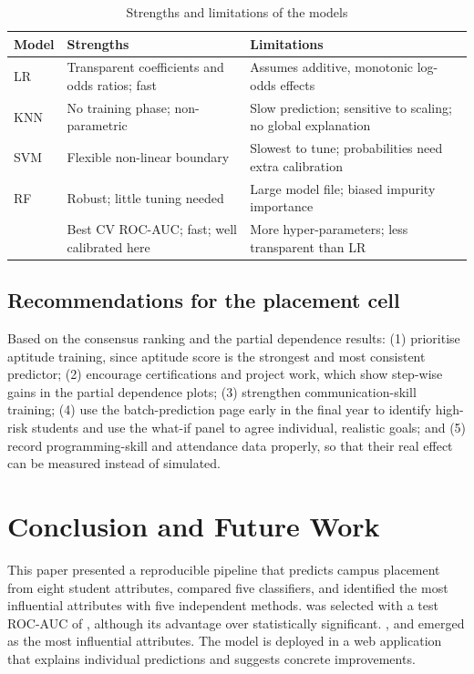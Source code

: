 \documentclass[conference]{IEEEtran}
\begin{document}
\begin{table}[t]
\centering
\caption{Strengths and limitations of the models}
\label{tab:sl}
\footnotesize
\begin{tabular}{p{1.3cm}p{3.0cm}p{3.2cm}}
\toprule
Model & Strengths & Limitations \\
\midrule
LR & Transparent coefficients and odds ratios; fast & Assumes additive, monotonic log-odds effects \\
KNN & No training phase; non-parametric & Slow prediction; sensitive to scaling; no global explanation \\
SVM & Flexible non-linear boundary & Slowest to tune; probabilities need extra calibration \\
RF & Robust; little tuning needed & Large model file; biased impurity importance \\
\XGBName{} & Best CV ROC-AUC; fast; well calibrated here & More hyper-parameters; less transparent than LR \\
\bottomrule
\end{tabular}
\end{table}

\subsection{Recommendations for the placement cell}
Based on the consensus ranking and the partial dependence results: (1) prioritise aptitude training, since aptitude
score is the strongest and most consistent predictor; (2) encourage certifications and project work, which show
step-wise gains in the partial dependence plots; (3) strengthen communication-skill training; (4) use the batch-prediction page early in
the final year to identify high-risk students and use the what-if panel to agree individual, realistic goals;
and (5) record programming-skill and attendance data properly, so that their real effect can be measured instead
of simulated.

\section{Conclusion and Future Work}\label{sec:conclusion}
This paper presented a reproducible pipeline that predicts campus placement from eight student attributes,
compared five classifiers, and identified the most influential attributes with five independent methods.
\BestModel{} was selected with a test ROC-AUC of \BestTestAUC{}, although its advantage over \SecondModel{}
\StatSig{} statistically significant. \TopOne{}, \TopTwo{} and \TopThree{} emerged as the most influential
attributes. The model is deployed in a web application that explains individual predictions and suggests
concrete improvements.
\end{document}
